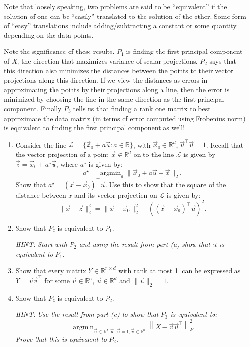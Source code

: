 \documentclass[10pt]{article}
\theoremstyle{definition}
\theoremstyle{plain}
\newcommand{\RR}{\mathbb{R}}
\DeclareMathOperator{\argmin}{argmin}
\begin{document}
Note that loosely speaking, two problems are said to be ``equivalent'' if the solution of one can be ``easily'' translated to the solution of the other. Some form of ``easy'' translations include adding/subtracting a constant or some quantity depending on the data points.

Note the significance of these results. $P_1$ is finding the first principal component of $X$, the direction that maximizes variance of scalar projections. $P_2$ says that this direction also minimizes the distances between the points to their vector projections along this direction. If we view the distances as errors in approximating the points by their projections along a line, then the error is minimized by choosing the line in the same direction as the first principal component. Finally $P_3$ tells us that finding a rank one matrix to best approximate the data matrix (in terms of error computed using Frobenius norm) is equivalent to finding the first principal component as well!

\begin{enumerate}[label=(\alph*)]
\item Consider the line $\mathcal{L} = \{\vec{x}_0 + a\vec{u} : a \in \RR\}$, with $\vec{x}_0 \in \RR^d$, $\vec{u}^\top \vec{u} = 1$. Recall that the vector projection of a point $\vec{x} \in \RR^d$ on to the line $\mathcal{L}$ is given by $\vec{z} = \vec{x}_0 + a^\star \vec{u}$, where $a^\star$ is given by:
\begin{equation}
a^\star = \argmin_a \|\vec{x}_0 + a\vec{u} - \vec{x}\|_2.
\end{equation}
Show that $a^\star = (\vec{x} - \vec{x}_0)^\top \vec{u}$. Use this to show that the square of the distance between $x$ and its vector projection on $\mathcal{L}$ is given by:
\begin{equation}
\|\vec{x} - \vec{z}\|_2^2 = \|\vec{x} - \vec{x}_0\|_2^2 - ((\vec{x} - \vec{x}_0)^\top \vec{u})^2.
\end{equation}

\item Show that $P_2$ is equivalent to $P_1$.

\textit{HINT: Start with $P_2$ and using the result from part (a) show that it is equivalent to $P_1$.}

\item Show that every matrix $Y \in \RR^{n \times d}$ with rank at most 1, can be expressed as $Y = \vec{v}\vec{u}^\top$ for some $\vec{v} \in \RR^n$, $\vec{u} \in \RR^d$ and $\|\vec{u}\|_2 = 1$.

\item Show that $P_3$ is equivalent to $P_2$.

\textit{HINT: Use the result from part (c) to show that $P_3$ is equivalent to:}
\begin{equation}
\argmin_{\vec{u} \in \RR^d : \vec{u}^\top \vec{u} = 1, \vec{v} \in \RR^n} \left\|X - \vec{v}\vec{u}^\top\right\|_F^2
\end{equation}
\textit{Prove that this is equivalent to $P_2$.}
\end{enumerate}
\end{document}
